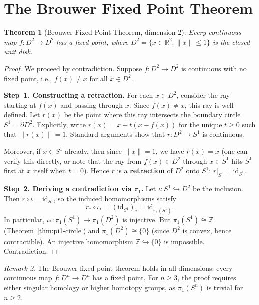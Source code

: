 \documentclass[11pt,a4paper,twoside]{book}
\newtheorem{theorem}{Theorem}[section]
\theoremstyle{remark}
\newtheorem{remark}[theorem]{Remark}
\theoremstyle{definition}
\theoremstyle{definition}
\begin{document}

\section{The Brouwer Fixed Point Theorem}
\label{sec:brouwer}

\begin{theorem}[Brouwer Fixed Point Theorem, dimension 2]
\label{thm:brouwer-fixed-point}
Every continuous map $f\colon D^2\to D^2$ has a fixed point, where
$D^2=\{x\in\mathbb{R}^2:\|x\|\le 1\}$ is the closed unit disk.
\end{theorem}

\begin{proof}
We proceed by contradiction.  Suppose $f\colon D^2\to D^2$ is
continuous with no fixed point, i.e., $f(x)\neq x$ for all $x\in D^2$.

\textbf{Step~1.  Constructing a retraction.}
For each $x\in D^2$, consider the ray starting at $f(x)$ and passing
through $x$.  Since $f(x)\neq x$, this ray is well-defined.  Let
$r(x)$ be the point where this ray intersects the boundary circle
$S^1=\partial D^2$.  Explicitly, write $r(x) = x + t(x-f(x))$ for
the unique $t\ge 0$ such that $\|r(x)\|=1$.  Standard arguments show
that $r\colon D^2\to S^1$ is continuous.

Moreover, if $x\in S^1$ already, then since $\|x\|=1$, we have
$r(x)=x$ (one can verify this directly, or note that the ray from
$f(x)\in D^2$ through $x\in S^1$ hits $S^1$ first at $x$ itself when
$t=0$).  Hence $r$ is a \textbf{retraction} of $D^2$
onto $S^1$: $r|_{S^1}=\mathrm{id}_{S^1}$.

\textbf{Step~2.  Deriving a contradiction via $\pi_1$.}
Let $\iota\colon S^1\hookrightarrow D^2$ be the inclusion.  Then
$r\circ\iota = \mathrm{id}_{S^1}$, so the induced homomorphisms
satisfy
\[
  r_* \circ \iota_* = (\mathrm{id}_{S^1})_*
  = \mathrm{id}_{\pi_1(S^1)}.
\]
In particular, $\iota_*\colon\pi_1(S^1)\to\pi_1(D^2)$ is injective.
But $\pi_1(S^1)\cong\mathbb{Z}$ (Theorem~\ref{thm:pi1-circle}) and
$\pi_1(D^2)\cong\{0\}$ (since $D^2$ is convex, hence contractible).
An injective homomorphism $\mathbb{Z}\hookrightarrow\{0\}$ is
impossible.  Contradiction.
\end{proof}

\begin{remark}
\label{rem:brouwer-higher-dim}
The Brouwer fixed point theorem holds in all dimensions: every
continuous map $f\colon D^n\to D^n$ has a fixed point.  For $n\ge 3$,
the proof requires either singular homology or higher homotopy groups,
as $\pi_1(S^n)$ is trivial for $n\ge 2$.
\end{remark}
\end{document}
